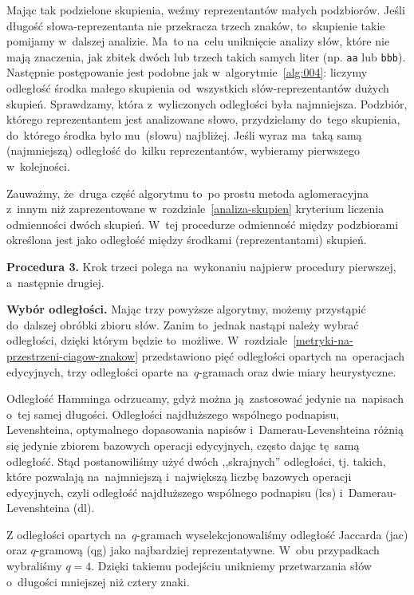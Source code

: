 \documentclass{praca1}
\begin{document}
Mając tak podzielone skupienia, weźmy reprezentantów małych podzbiorów. Jeśli długość słowa-reprezentanta nie przekracza trzech znaków, to~skupienie takie pomijamy w~dalszej analizie. Ma~to na~celu uniknięcie analizy słów, które nie mają znaczenia, jak zbitek dwóch lub trzech takich samych liter (np. \verb|aa| lub \verb|bbb|). Następnie postępowanie jest podobne jak w~algorytmie~\ref{alg:004}: liczymy odległość środka małego skupienia od~wszystkich słów-reprezentantów dużych skupień. Sprawdzamy, która z~wyliczonych odległości była najmniejsza. Podzbiór, którego reprezentantem jest analizowane słowo, przydzielamy do~tego skupienia, do~którego środka było mu~(słowu) najbliżej. Jeśli wyraz ma~taką samą (najmniejszą) odległość do~kilku reprezentantów, wybieramy pierwszego w~kolejności.

Zauważmy, że~druga część algorytmu to~po prostu metoda aglomeracyjna z~innym niż zaprezentowane w~rozdziale~\ref{analiza-skupien} kryterium liczenia odmienności dwóch skupień. W~tej procedurze odmienność między podzbiorami określona jest jako odległość między środkami (reprezentantami) skupień.



\textbf{Procedura 3.} Krok trzeci polega na~wykonaniu najpierw procedury pierwszej, a~następnie drugiej.

\textbf{Wybór odległości.} Mając trzy powyższe algorytmy, możemy przystąpić do~dalszej obróbki zbioru słów. Zanim to~jednak nastąpi należy wybrać odległości, dzięki którym będzie to~możliwe. W~rozdziale~\ref{metryki-na-przestrzeni-ciagow-znakow} przedstawiono pięć odległości opartych na~operacjach edycyjnych, trzy odległości oparte na~$q$-gramach oraz dwie miary heurystyczne. 

Odległość Hamminga odrzucamy, gdyż można ją~zastosować jedynie na~napisach o~tej samej długości. Odległości najdłuższego wspólnego podnapisu, Levenshteina, optymalnego dopasowania napisów i~Damerau-Levenshteina różnią się jedynie zbiorem bazowych operacji edycyjnych, często dając tę~samą odległość. Stąd postanowiliśmy użyć dwóch ,,skrajnych'' odległości, tj. takich, które pozwalają na~najmniejszą i~największą liczbę bazowych operacji edycyjnych, czyli odległość najdłuższego wspólnego podnapisu (lcs) i~Damerau-Levenshteina (dl). 

Z odległości opartych na~$q$-gramach wyselekcjonowaliśmy odległość Jaccarda (jac) oraz $q$-gramową (qg) jako najbardziej reprezentatywne. W~obu przypadkach wybraliśmy $q=4$. Dzięki takiemu podejściu unikniemy przetwarzania słów o~długości mniejszej niż cztery znaki.
\end{document}
